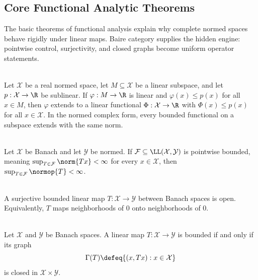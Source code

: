 \subsection{Core Functional Analytic Theorems}

%

The basic theorems of functional analysis explain why complete normed spaces behave rigidly under linear maps. Baire category supplies the hidden engine: pointwise control, surjectivity, and closed graphs become uniform operator statements.

\begin{theorem} \label{thm:hahn-banach-extension} \\
Let $\mathcal{X}$ be a real normed space, let $M\subseteq\mathcal{X}$ be a linear subspace, and let $p:\mathcal{X}\to\R$ be sublinear. If $\varphi:M\to\R$ is linear and $\varphi(x)\leq p(x)$ for all $x\in M$, then $\varphi$ extends to a linear functional $\Phi:\mathcal{X}\to\R$ with $\Phi(x)\leq p(x)$ for all $x\in\mathcal{X}$. In the normed complex form, every bounded functional on a subspace extends with the same norm.
\end{theorem}

\begin{theorem} \label{thm:uniform-boundedness-principle} \\
Let $\mathcal{X}$ be Banach and let $\mathcal{Y}$ be normed. If $\mathcal{F}\subseteq\LL(\mathcal{X},\mathcal{Y})$ is pointwise bounded, meaning $\sup_{T\in\mathcal{F}}\norm{Tx}<\infty$ for every $x\in\mathcal{X}$, then $\sup_{T\in\mathcal{F}}\normop{T}<\infty$.
\end{theorem}

\begin{theorem} \label{thm:open-mapping-theorem} \\
A surjective bounded linear map $T:\mathcal{X}\to\mathcal{Y}$ between Banach spaces is open. Equivalently, $T$ maps neighborhoods of $0$ onto neighborhoods of $0$.
\end{theorem}

\begin{theorem} \label{thm:closed-graph-theorem} \\
Let $\mathcal{X}$ and $\mathcal{Y}$ be Banach spaces. A linear map $T:\mathcal{X}\to\mathcal{Y}$ is bounded if and only if its graph
\[
\Gamma(T)\defeq\{(x,Tx):x\in\mathcal{X}\}
\]
is closed in $\mathcal{X}\times\mathcal{Y}$.
\end{theorem}
